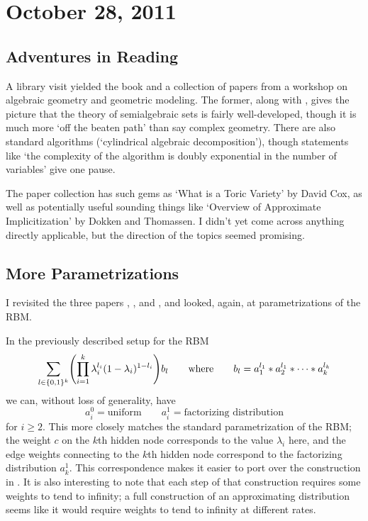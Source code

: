 \documentclass[12pt]{article}
\begin{document}
\section{October 28, 2011}

\subsection{Adventures in Reading}

A library visit yielded the book \cite{BCR98} and a collection of papers
\cite{Top02} from a workshop on algebraic geometry and geometric modeling.  The
former, along with \cite{Cos09}, gives the picture that the theory of
semialgebraic sets is fairly well-developed, though it is much more `off the
beaten path' than say complex geometry.  There are also standard algorithms
(`cylindrical algebraic decomposition'), though statements like `the complexity
of the algorithm is doubly exponential in the number of variables' give one
pause.

The paper collection has such gems as `What is a Toric Variety' by David Cox, as
well as potentially useful sounding things like `Overview of Approximate
Implicitization' by Dokken and Thomassen.  I didn't yet come across anything
directly applicable, but the direction of the topics seemed promising.

\subsection{More Parametrizations}

I revisited the three papers \cite{CMS09}, \cite{Mon10}, and \cite{MA10}, and
looked, again, at parametrizations of the RBM.

In the previously described setup for the RBM
\[
    \sum_{l \in \{0,1\}^k} \pdel*{\prod_{i=1}^k \lambda_i^{l_i} (1 -
    \lambda_i)^{1 - l_i}} b_l
    \qquad\text{where}\qquad
    b_l = a_1^{l_1} * a_2^{l_1} * \cdots * a_k^{l_k}
\]
we can, without loss of generality, have
\[
    a_i^0 = \text{uniform}
    \qquad
    a_i^1 = \text{factorizing distribution}
\]
for $i \ge 2$.  This more closely matches the standard parametrization of the
RBM; the weight $c$ on the $k$th hidden node corresponds to the value
$\lambda_i$ here, and the edge weights connecting to the $k$th hidden node
correspond to the factorizing distribution $a_k^1$.  This correspondence makes
it easier to port over the construction in \cite{MA10}.  It is also interesting
to note that each step of that construction requires some weights to tend to
infinity; a full construction of an approximating distribution seems like it
would require weights to tend to infinity at different rates.
\end{document}
